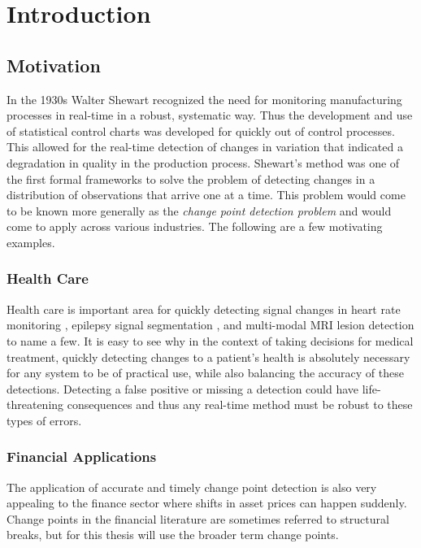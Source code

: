 \chapter{Introduction}
\section{Motivation}
In the 1930s Walter Shewart recognized the need for monitoring manufacturing processes in real-time in a robust, systematic way. Thus the development and use of statistical control charts was developed for quickly out of control processes. This allowed for the real-time detection of changes in variation that indicated a degradation in quality in the production process. Shewart's method was one of the first formal frameworks to solve the problem of detecting changes in a distribution of observations that arrive one at a time. This problem would come to be known more generally as the \textit{change point detection problem} and would come to apply across various industries. The following are a few motivating examples.

\subsection{Health Care}
Health care is important area for quickly detecting signal changes in heart rate monitoring \cite{yang2006adaptive} \cite{staudacher2005new}, epilepsy signal segmentation \cite{malladi2013online}, and multi-modal MRI lesion detection \cite{bosc2003automatic} to name a few. It is easy to see why in the context of taking decisions for medical treatment, quickly detecting changes to a patient's health is absolutely necessary for any system to be of practical use, while also balancing the accuracy of these detections. Detecting a false positive or missing a detection could have life-threatening consequences and thus any real-time method must be robust to these types of errors.


\subsection{Financial Applications}
The application of accurate and timely change point detection is also very appealing to the finance sector where shifts in asset prices can happen suddenly. Change points in the financial literature are sometimes referred to structural breaks, but for this thesis will use the broader term change points. %

